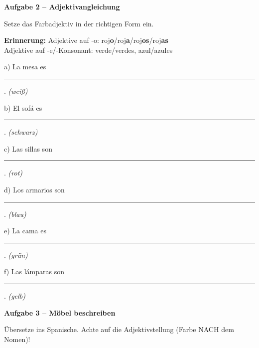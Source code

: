 \documentclass[11pt, a4paper]{article}
\newcommand{\fachfarbe}{spanisch}
\newcommand{\punktebox}[1]{\hfill\fbox{\small \_/#1}}
\newcommand{\luecke}[1]{\rule{#1}{0.4pt}}
\newenvironment{aufgabe}[1]{%
    \needspace{5\baselineskip}%
    \nopagebreak[4]%
    \vspace{10pt}
    \noindent\textbf{\textcolor{\fachfarbe}{Aufgabe #1}}
    \nopagebreak[4]%
    \vspace{5pt}
    \nopagebreak[4]%
    \begin{list}{}{\leftmargin=0pt}
    \item[]
}{%
    \end{list}
}
\begin{document}
\vspace{15pt}


\begin{aufgabe}{2 -- Adjektivangleichung}
Setze das Farbadjektiv in der richtigen Form ein. \punktebox{12}
\end{aufgabe}

\begin{regelbox}
\textbf{Erinnerung:} Adjektive auf -o: roj\textbf{o}/roj\textbf{a}/roj\textbf{os}/roj\textbf{as} \\
Adjektive auf -e/-Konsonant: verde/verdes, azul/azules
\end{regelbox}

\vspace{0.8em}

\noindent
a) La mesa es \luecke{3cm}. \hfill \textit{(weiß)}

\vspace{0.8em}

\noindent
b) El sofá es \luecke{3cm}. \hfill \textit{(schwarz)}

\vspace{0.8em}

\noindent
c) Las sillas son \luecke{3cm}. \hfill \textit{(rot)}

\vspace{0.8em}

\noindent
d) Los armarios son \luecke{3cm}. \hfill \textit{(blau)}

\vspace{0.8em}

\noindent
e) La cama es \luecke{3cm}. \hfill \textit{(grün)}

\vspace{0.8em}

\noindent
f) Las lámparas son \luecke{3cm}. \hfill \textit{(gelb)}

\vspace{15pt}


\begin{aufgabe}{3 -- Möbel beschreiben}
Übersetze ins Spanische. Achte auf die Adjektivstellung (Farbe NACH dem Nomen)! \punktebox{8}
\end{aufgabe}
\end{document}
